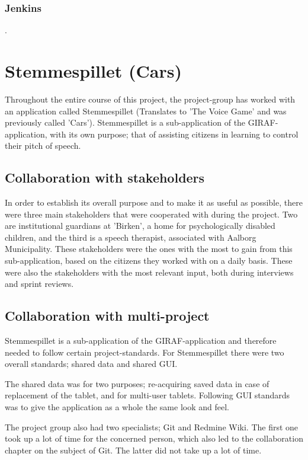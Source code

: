 \subsubsection{Jenkins}
.

\section{Stemmespillet (Cars)}
Throughout the entire course of this project, the project-group has worked with an application called Stemmespillet (Translates to 'The Voice Game' and was previously called 'Cars').
Stemmespillet is a sub-application of the GIRAF-application, with its own purpose; that of assisting citizens in learning to control their pitch of speech.

\subsection{Collaboration with stakeholders}
In order to establish its overall purpose and to make it as useful as possible, there were three main stakeholders that were cooperated with during the project.
Two are institutional guardians at 'Birken', a home for psychologically disabled children, and the third is a speech therapist, associated with Aalborg Municipality.
These stakeholders were the ones with the most to gain from this sub-application, based on the citizens they worked with on a daily basis.
These were also the stakeholders with the most relevant input, both during interviews and sprint reviews.

\subsection{Collaboration with multi-project}
Stemmespillet is a sub-application of the GIRAF-application and therefore needed to follow certain project-standards.
For Stemmespillet there were two overall standards; shared data and shared GUI.

The shared data was for two purposes; re-acquiring saved data in case of replacement of the tablet, and for multi-user tablets.
Following GUI standards was to give the application as a whole the same look and feel.

The project group also had two specialists; Git and Redmine Wiki.
The first one took up a lot of time for the concerned person, which also led to the collaboration chapter on the subject of Git.
The latter did not take up a lot of time.